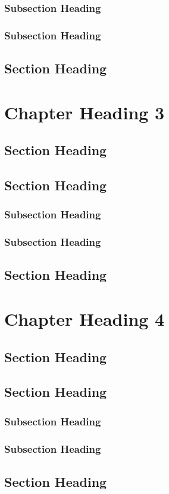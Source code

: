 \documentclass{aaltoseries}
\begin{document}
\subsection{Subsection Heading}
\lipsum[7-8]
\subsection{Subsection Heading}
\lipsum[9-10]
\section{Section Heading}
\lipsum[11-12]

\chapter[Alternative Chapter 3 Heading]{Chapter Heading 3}
\section{Section Heading}
\lipsum[1-4]
\section{Section Heading}
\lipsum[5-6]
\subsection{Subsection Heading}
\lipsum[7-8]
\subsection{Subsection Heading}
\lipsum[9-10]
\section{Section Heading}
\lipsum[11-12]


\chapter{Chapter Heading 4}
\section{Section Heading}
\lipsum[1-4]
\section{Section Heading}
\lipsum[5-6]
\subsection{Subsection Heading}
\lipsum[7-8]
\subsection{Subsection Heading}
\lipsum[9-10]
\section{Section Heading}
\lipsum[11-12]
\end{document}
